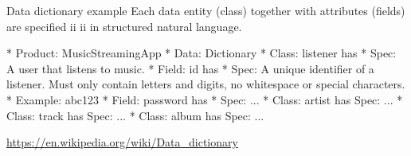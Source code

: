 \begin{Slide}{Data dictionary example}
Each data entity (class) together with attributes (fields) are specified ii ii in structured natural language.

\begin{Code}[language=reqt]
* Product: MusicStreamingApp
* Data: Dictionary
  * Class: listener has
    * Spec: A user that listens to music.
    * Field: id has
      * Spec: A unique identifier of a listener. Must only contain letters and digits, no whitespace or special characters.
      * Example: abc123
    * Field: password has
      * Spec: ...
  * Class: artist has Spec: ...
  * Class: track has Spec: ...
  * Class: album has Spec: ...
\end{Code}

{\small\url{https://en.wikipedia.org/wiki/Data_dictionary}}
\end{Slide}
